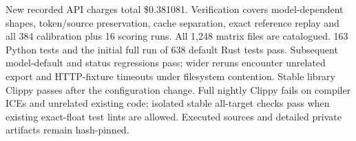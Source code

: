 New recorded API charges total \$0.381081.
Verification covers model-dependent shapes, token/source preservation, cache
separation, exact reference replay and all 384 calibration plus 16 scoring runs.
All 1,248 matrix files are catalogued. 163 Python tests and the initial full run
of 638 default Rust tests pass. Subsequent model-default and status regressions
pass; wider reruns encounter unrelated export and HTTP-fixture timeouts under
filesystem contention. Stable library Clippy passes after the configuration change.
Full nightly Clippy fails on compiler ICEs and unrelated existing code;
isolated stable all-target checks pass when existing exact-float test lints are
allowed. Executed sources and detailed private artifacts remain hash-pinned.
